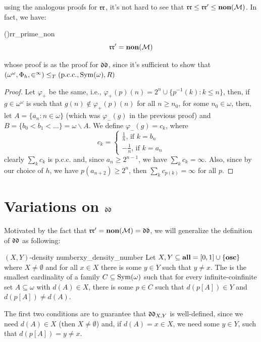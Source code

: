 using the analogous proofs for $\mathfrak{rr}$, it's not hard to see that $\mathfrak{rr}\leq\mathfrak{rr}'\leq\textbf{non}(\mathcal{M})$. In fact, we have:

\begin{theorem}{(\cite{brech})}{rr_prime_non}
    $$\mathfrak{rr}'=\textbf{non}(\mathcal{M})$$
\end{theorem}

whose proof is as the proof for $\mathfrak{dd}$, since it's sufficient to show that $(\omega^\omega,\Phi_h,\in^\infty)\leq_T(\text{p.c.c.},\mathrm{Sym}(\omega),R)$

\begin{proof}
    Let $\varphi_+$ be the same, i.e., $\varphi_+(p)(n)=2^n\cup\{p^{-1}(k):k\leq n\}$, then, if $g\in\omega^\omega$ is such that $g(n)\notin\varphi_+(p)(n)$ for all $n\geq n_0$, for some $n_0\in\omega$, then, let $A=\{a_n:n\in\omega\}$ (which was $\varphi_-(g)$ in the previous proof) and $B=\{b_0<b_1<\dots\}=\omega\backslash A$. We define $\varphi_-(g)=c_k$, where
    $$c_k=\begin{cases}
        \frac1n\text{, if }k=b_n\\
        -\frac1n\text{, if }k=a_n
    \end{cases}$$
    clearly $\sum_k c_k$ is p.c.c. and, since $a_n\geq2^{n-1}$, we have $\sum_kc_k=\infty$. Also, since by our choice of $h$, we have $p(a_{n+2})\geq2^n$, then $\sum_kc_{p(k)}=\infty$ for all $p$.
\end{proof}

\section{Variations on \texorpdfstring{$\mathfrak{dd}$}{dd}}

Motivated by the fact that $\mathfrak{rr}'=\textbf{non}(\mathcal{M})=\mathfrak{dd}$, we will generalize the definition of $\mathfrak{dd}$ as following:

\begin{definition}{$(X,Y)$-density number}{xy_density_number}
    Let $X,Y\subseteq\textbf{all}=[0,1]\cup\{\mathbf{osc}\}$ where $X\neq\emptyset$ and for all $x\in X$ there is some $y\in Y$ such that $y\neq x$. The  is the smallest cardinality of a family $C\subseteq\mathrm{Sym}(\omega)$ such that for every infinite-coinfinite set $A\subseteq\omega$ with $d(A)\in X$, there is some $p\in C$ such that $d(p[A])\in Y$ and $d(p[A])\neq d(A)$.
\end{definition}

The first two conditions are to guarantee that $\mathfrak{dd}_{X,Y}$ is well-defined, since we need $d(A)\in X$ (then $X\neq\emptyset$) and, if $d(A)=x\in X$, we need some $y\in Y$, such that $d(p[A])=y\neq x$.

